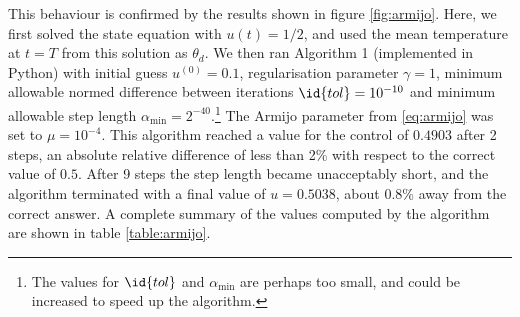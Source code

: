 This behaviour is confirmed by the results shown in figure \ref{fig:armijo}. Here, we first solved the state equation with $u(t) = 1/2$, and used the mean temperature at $t=T$ from this solution as $\theta_d$. We then ran Algorithm 1 (implemented in Python) with initial guess $u^{(0)} = 0.1$, regularisation parameter $\gamma = 1$, minimum allowable normed difference between iterations $\id{tol} = 10^{-10}$ and minimum allowable step length $\alpha_{\min} = 2^{-40}$.\footnote{The values for $\id{tol}$ and $\alpha_{\min}$ are perhaps too small, and could be increased to speed up the algorithm.} The Armijo parameter from \eqref{eq:armijo} was set to $\mu=10^{-4}$. This algorithm reached a value for the control of $0.4903$ after 2 steps, an absolute relative difference of less than 2\% with respect to the correct value of $0.5$. After 9 steps the step length became unacceptably short, and the algorithm terminated with a final value of $u=0.5038$, about 0.8\% away from the correct answer. A complete summary of the values computed by the algorithm are shown in table \ref{table:armijo}. 

